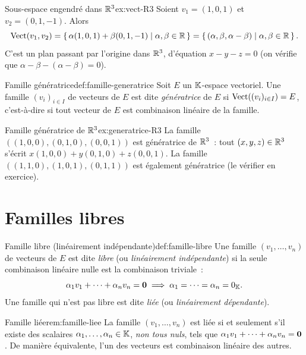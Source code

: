 \begin{example}{Sous-espace engendré dans ${\mathbb{R}}^3$}{ex:vect-R3}
  Soient $v_1=(1,0,1)$ et $v_2=(0,1,-1)$. Alors
  \[
    \operatorname{Vect}(v_1,v_2) = \left\{\,\alpha(1,0,1)+\beta(0,1,-1)\;\middle|\;\alpha,\beta\in{\mathbb{R}}\,\right\}
    = \left\{\,(\alpha,\beta,\alpha-\beta)\;\middle|\;\alpha,\beta\in{\mathbb{R}}\,\right\}.
  \]
  C'est un plan passant par l'origine dans ${\mathbb{R}}^3$, d'équation
  $x-y-z=0$ (on vérifie que $\alpha-\beta-(\alpha-\beta)=0$).
\end{example}

\begin{definition}{Famille génératrice}{def:famille-generatrice}
  Soit $E$ un ${\mathbb{K}}$-espace vectoriel. Une famille $(v_i)_{i\in I}$ de
  vecteurs de $E$ est dite \emph{génératrice} de $E$ si
  $\operatorname{Vect}((v_i)_{i\in I})=E$, c'est-à-dire si tout vecteur de $E$ est
  combinaison linéaire de la famille.
\end{definition}

\begin{example}{Famille génératrice de ${\mathbb{R}}^3$}{ex:generatrice-R3}
  La famille $((1,0,0),(0,1,0),(0,0,1))$ est génératrice de ${\mathbb{R}}^3$~:
  tout $(x,y,z)\in{\mathbb{R}}^3$ s'écrit $x(1,0,0)+y(0,1,0)+z(0,0,1)$. La
  famille $((1,1,0),(1,0,1),(0,1,1))$ est également génératrice
  (le vérifier en exercice).
\end{example}

\section{Familles libres}\label{sec:familles-libres}

\begin{definition}{Famille libre (linéairement indépendante)}{def:famille-libre}
  Une famille $(v_1,\ldots,v_n)$ de vecteurs de $E$ est dite
  \emph{libre} (ou \emph{linéairement indépendante}) si la seule
  combinaison linéaire nulle est la combinaison triviale~:
  \[
    \alpha_1 v_1+\cdots+\alpha_n v_n = \mathbf{0}
    \implies
    \alpha_1=\cdots=\alpha_n=0_{\mathbb{K}}.
  \]
  Une famille qui n'est pas libre est dite \emph{liée}%
   (ou \emph{linéairement dépendante}).
\end{definition}

\begin{remark}{Famille liée}{rem:famille-liee}
  La famille $(v_1,\ldots,v_n)$ est liée si et seulement s'il existe
  des scalaires $\alpha_1,\ldots,\alpha_n\in{\mathbb{K}}$, \emph{non tous nuls},
  tels que $\alpha_1 v_1+\cdots+\alpha_n v_n=\mathbf{0}$. De manière
  équivalente, l'un des vecteurs est combinaison linéaire des autres.
\end{remark}

